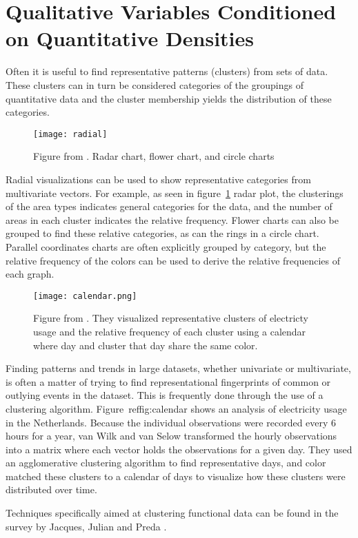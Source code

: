 \section{Qualitative Variables Conditioned on Quantitative Densities}  

Often it is useful to find representative patterns (clusters) from sets of data. These clusters can in turn be considered categories of the groupings of quantitative data and the cluster membership yields the distribution of these categories. 

\begin{figure}
\texttt{[image: radial]}
\caption{Figure from \cite{albo_off_2016}. Radar chart, flower chart, and circle
  charts}
\label{fig:radial}
\end{figure}
Radial visualizations can be used to show representative
categories from multivariate vectors. For example, as seen in figure~\ref{fig:radial}
radar plot, the clusterings of the area types indicates general categories for
the data, and the number of areas in each cluster indicates the relative
frequency. Flower charts can also be grouped to find these relative
categories, as can the rings in a circle chart. Parallel coordinates charts are often explicitly grouped by category, but the relative frequency of the colors can be used to derive the relative frequencies of each graph. 

\begin{figure}
\texttt{[image: calendar.png]}
\caption{Figure from \cite{van_wijk_cluster_1999}. They visualized representative clusters of electricty usage and the relative frequency of each cluster using a calendar where day and cluster that day share the same color.}
\label{fig:calendar}
\end{figure}

Finding patterns and trends in large datasets, whether univariate or multivariate, is often a matter of trying to find representational fingerprints of common or outlying events in the dataset. This is frequently done through the use of a clustering algorithm. Figure~ref{fig:calendar} shows an analysis of electricity usage in the Netherlands\cite{van_wijk_cluster_1999}. Because the individual observations were recorded every 6 hours for a year, van Wilk and van Selow transformed the hourly observations into a matrix where each vector holds the observations for a given day. They used an agglomerative clustering algorithm \cite{kaufman_agglomerative_1990} to find representative days, and color matched these clusters to a calendar of days to visualize how these clusters were distributed over time. 

Techniques specifically aimed at clustering functional data can be found in the survey by Jacques, Julian and Preda \cite{Jacques_functional_2014}. %
